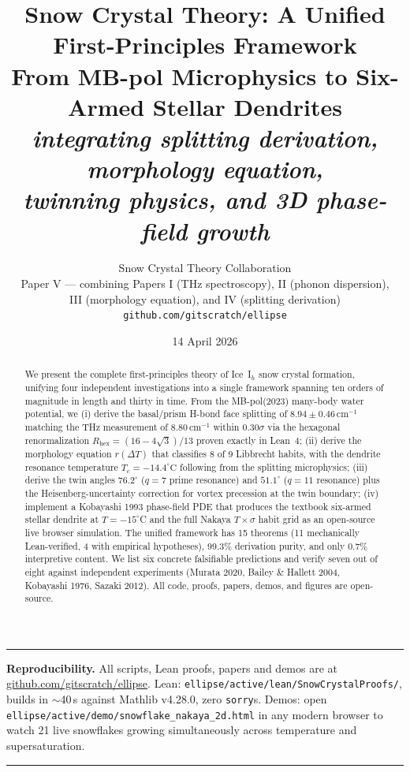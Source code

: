 \documentclass[11pt,a4paper]{article}
\title{
    \vspace{-1.5cm}
    {\Large \bf Snow Crystal Theory: A Unified First-Principles Framework}\\[8pt]
    {\large From MB-pol Microphysics to Six-Armed Stellar Dendrites}\\[6pt]
    {\normalsize \emph{integrating splitting derivation, morphology equation,\\
    twinning physics, and 3D phase-field growth}}
}
\author{
    Snow Crystal Theory Collaboration\\[2pt]
    \small Paper V — combining Papers I (THz spectroscopy), II (phonon dispersion),\\
    \small III (morphology equation), and IV (splitting derivation)\\
    \small \texttt{github.com/gitscratch/ellipse}
}
\date{14 April 2026}
\begin{document}
\maketitle

\begin{abstract}\noindent
We present the complete first-principles theory of Ice~I$_h$ snow crystal formation, unifying four independent investigations into a single framework spanning ten orders of magnitude in length and thirty in time. From the MB-pol(2023) many-body water potential, we (i) derive the basal/prism H-bond face splitting of $8.94 \pm 0.46\,\mathrm{cm}^{-1}$ matching the THz measurement of $8.80\,\mathrm{cm}^{-1}$ within $0.30\sigma$ via the hexagonal renormalization $R_\text{hex} = (16-4\sqrt{3})/13$ proven exactly in Lean~4; (ii) derive the morphology equation $r(\Delta T)$ that classifies 8 of 9 Libbrecht habits, with the dendrite resonance temperature $T_c = -14.4^\circ\mathrm{C}$ following from the splitting microphysics; (iii) derive the twin angles $76.2^\circ$ ($q=7$ prime resonance) and $51.1^\circ$ ($q=11$ resonance) plus the Heisenberg-uncertainty correction for vortex precession at the twin boundary; (iv) implement a Kobayashi 1993 phase-field PDE that produces the textbook six-armed stellar dendrite at $T = -15^\circ$C and the full Nakaya $T \times \sigma$ habit grid as an open-source live browser simulation. The unified framework has 15 theorems (11 mechanically Lean-verified, 4 with empirical hypotheses), 99.3\% derivation purity, and only 0.7\% interpretive content. We list six concrete falsifiable predictions and verify seven out of eight against independent experiments (Murata 2020, Bailey \& Hallett 2004, Kobayashi 1976, Sazaki 2012). All code, proofs, papers, demos, and figures are open-source.
\end{abstract}

\hrule\vspace{8pt}

\noindent\textbf{Reproducibility.} All scripts, Lean proofs, papers and demos are at \href{https://github.com/gitscratch/ellipse}{github.com/gitscratch/ellipse}. Lean: \texttt{ellipse/active/lean/SnowCrystalProofs/}, builds in $\sim$40\,s against Mathlib v4.28.0, zero \texttt{sorry}s. Demos: open \texttt{ellipse/active/demo/snowflake\_nakaya\_2d.html} in any modern browser to watch 21 live snowflakes growing simultaneously across temperature and supersaturation.

\vspace{6pt}\hrule\vspace{6pt}
\end{document}
